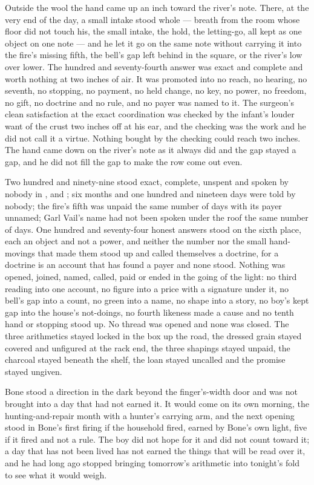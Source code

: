 Outside the wool the hand came up an inch toward the river's note. There, at the very end of the day, a small intake stood whole --- breath from the room whose floor did not touch his, the small intake, the hold, the letting-go, all kept as one object on one note --- and he let it go on the same note without carrying it into the fire's missing fifth, the bell's gap left behind in the square, or the river's low over lower. The hundred and seventy-fourth answer was exact and complete and worth nothing at two inches of air. It was promoted into no reach, no hearing, no seventh, no stopping, no payment, no held change, no key, no power, no freedom, no gift, no doctrine and no rule, and no payer was named to it. The surgeon's clean satisfaction at the exact coordination was checked by the infant's louder want of the crust two inches off at his ear, and the checking was the work and he did not call it a virtue. Nothing bought by the checking could reach two inches. The hand came down on the river's note as it always did and the gap stayed a gap, and he did not fill the gap to make the row come out even.

Two hundred and ninety-nine stood exact, complete, unspent and spoken by nobody in ,  and ; six months and one hundred and nineteen days were told by nobody; the fire's fifth was unpaid the same number of days with its payer unnamed; Garl Vail's name had not been spoken under the roof the same number of days. One hundred and seventy-four honest answers stood on the sixth place, each an object and not a power, and neither the number nor the small hand-movings that made them stood up and called themselves a doctrine, for a doctrine is an account that has found a payer and none stood. Nothing was opened, joined, named, called, paid or ended in the going of the light: no third reading into one account, no figure into a price with a signature under it, no bell's gap into a count, no green into a name, no shape into a story, no boy's kept gap into the house's not-doings, no fourth likeness made a cause and no tenth hand or stopping stood up. No thread was opened and none was closed. The three arithmetics stayed locked in the box up the road, the dressed grain stayed covered and unfigured at the rack end, the three shapings stayed unpaid, the charcoal stayed beneath the shelf, the loan stayed uncalled and the promise stayed ungiven.

Bone stood a direction in the dark beyond the finger's-width door and was not brought into a day that had not earned it. It would come on its own morning, the hunting-and-repair month with a hunter's carrying arm, and the next opening stood in Bone's first firing if the household fired, earned by Bone's own light, five if it fired and not a rule. The boy did not hope for it and did not count toward it; a day that has not been lived has not earned the things that will be read over it, and he had long ago stopped bringing tomorrow's arithmetic into tonight's fold to see what it would weigh.


